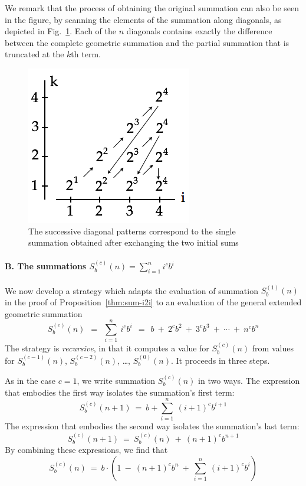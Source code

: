 We remark that the process of obtaining the original summation can also be seen in the figure, by scanning the elements of the summation along diagonals, as depicted in Fig.~\ref{fig:Sumi2iDiag}.  Each of the $n$ diagonals contains exactly the difference between the
complete geometric summation and the partial summation that is truncated at the $k$th term.
\begin{figure}[htb]
\centerline{
\includegraphics[scale=0.35]{FiguresMaths/Sumi2iDiag}
}
\caption{The successive diagonal patterns correspond to the single summation obtained after exchanging the two initial sums}
\label{fig:Sumi2iDiag}
\end{figure}


\paragraph{B. The summations $S^{(c)}_b(n) =  \sum_{i=1}^n i^c b^i$}

We now develop a strategy which adapts the evaluation of summation $S_b^{(1)}(n)$ in the proof of Proposition~\ref{thm:sum-i2i} to an evaluation of the general extended geometric summation
\[
S_b^{(c)}(n) \ \ = \ \ \sum_{i=1}^n \ i^c b^i
 \ \ = \ \
b \ + \ 2^{c} b^2\ + \ 3^{c} b^3 \ + \ \cdots \ + \ n^{c} b^{n}
\]
The strategy is {\em recursive}, in that it computes a value for $S^{(c)}_b(n)$ from values for $S^{(c-1)}_b(n)$, $S^{(c-2)}_b(n)$, \ldots, $S^{(0)}_b(n)$.  It proceeds in three steps.

\smallskip

As in the case $c=1$, we write summation $S_b^{(c)}(n)$ in two ways.  The expression that embodies the first way isolates the summation's first term:
\[ S_b^{(c)}(n+1) \ = \ b + \sum_{i=1}^n \ (i+1)^c b^{i+1} \]
The expression that embodies the second way isolates the summation's last term:
\[ S_b^{(c)}(n+1) \ = \ S_b^{(c)}(n) \ + \ (n+1)^{c} b^{n+1} \]
By combining these expressions, we find that
\begin{equation}
\label{eq:Sbcn-1}
S_b^{(c)}(n) 
 \ = \
b \cdot \left(
1 \ - \
(n+1)^{c} b^{n} \ + \
 \sum_{i=1}^n \ (i+1)^c b^{i} 
\right)
\end{equation}

